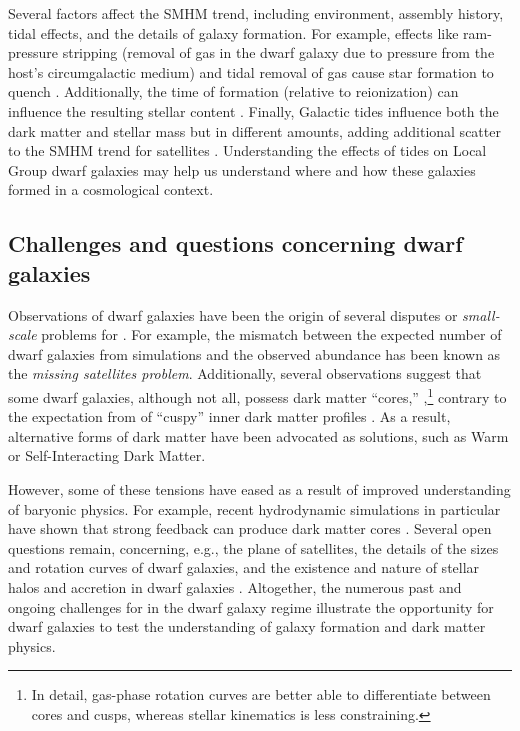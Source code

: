 Several factors affect the SMHM trend, including environment, assembly
history, tidal effects, and the details of galaxy formation. For
example, effects like ram-pressure stripping (removal of gas in the
dwarf galaxy due to pressure from the host's circumgalactic medium) and
tidal removal of gas cause star formation to quench
\citep[e.g.,][]{christensen+2024}. Additionally, the time of formation
(relative to reionization) can influence the resulting stellar content
\citep{kim+2024}. Finally, Galactic tides influence both the dark matter
and stellar mass but in different amounts, adding additional scatter to
the SMHM trend for satellites \citep[e.g.,][]{PNM2008, fattahi+2018}.
Understanding the effects of tides on Local Group dwarf galaxies may
help us understand where and how these galaxies formed in a cosmological
context.

\subsection{Challenges and questions concerning dwarf
galaxies}\label{challenges-and-questions-concerning-dwarf-galaxies}

Observations of dwarf galaxies have been the origin of several disputes
or \emph{small-scale} problems for \LCDM{} \citep[see reviews
by][]{bullock+boylan-kolchin2017, sales+2022}. For example, the mismatch
between the expected number of dwarf galaxies from simulations and the
observed abundance has been known as the \emph{missing satellites
problem}. Additionally, several observations suggest that some dwarf
galaxies, although not all, possess dark matter ``cores,''
\citep[e.g.,][]{moore1994, adams+2014, oh+2015, walker+penarrubia2011, read+walker+steger2019},\footnote{In
  detail, gas-phase rotation curves are better able to differentiate
  between cores and cusps, whereas stellar kinematics is less
  constraining.} contrary to the expectation from \LCDM{} of ``cuspy''
inner dark matter profiles \citep{NFW1996, NFW1997}. As a result,
alternative forms of dark matter have been advocated as solutions, such
as Warm or Self-Interacting Dark Matter.

However, some of these tensions have eased as a result of improved
understanding of baryonic physics. For example, recent hydrodynamic
simulations in particular have shown that strong feedback can produce
dark matter cores
\citetext{\citealp[e.g.,][\citet{tollet+2016}]{navarro+eke+frenk1996}; \citealp{fitts+2017}; \citealp{benitez-llambay+2019}; \citealp{orkney+2021}}.
Several open questions remain, concerning, e.g., the plane of
satellites, the details of the sizes and rotation curves of dwarf
galaxies, and the existence and nature of stellar halos and accretion in
dwarf galaxies \citep[e.g.,][]{sales+2022}. Altogether, the numerous
past and ongoing challenges for \LCDM{} in the dwarf galaxy regime
illustrate the opportunity for dwarf galaxies to test the understanding
of galaxy formation and dark matter physics.

